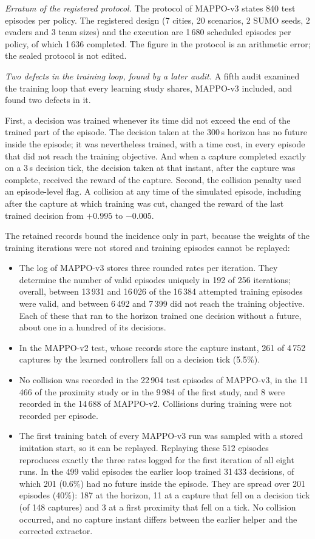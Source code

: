 \documentclass[preprint,12pt]{elsarticle}
\begin{document}
\emph{Erratum of the registered protocol.} The protocol of MAPPO-v3 states 840 test episodes per policy. The
registered design (7 cities, 20 scenarios, 2 SUMO seeds, 2 evaders and 3 team sizes) and the execution are 1\,680
scheduled episodes per policy, of which 1\,636 completed. The figure in the protocol is an arithmetic error; the
sealed protocol is not edited.

\emph{Two defects in the training loop, found by a later audit.} A fifth audit examined the training loop that
every learning study shares, MAPPO-v3 included, and found two defects in it.

First, a decision was trained whenever its time did not exceed the end of the trained part of the episode. The
decision taken at the 300\,s horizon has no future inside the episode; it was nevertheless trained, with a time cost,
in every episode that did not reach the training objective. And when a capture completed exactly on a 3\,s decision
tick, the decision taken at that instant, after the capture was complete, received the reward of the capture.
Second, the collision penalty used an episode-level flag. A collision at any time of the simulated episode,
including after the capture at which training was cut, changed the reward of the last trained decision from $+0.995$
to $-0.005$.

The retained records bound the incidence only in part, because the weights of the training iterations were not
stored and training episodes cannot be replayed:
\begin{itemize}
\item The log of MAPPO-v3 stores three rounded rates per iteration. They determine the number of valid episodes
uniquely in 192 of 256 iterations; overall, between 13\,931 and 16\,026 of the 16\,384 attempted training episodes
were valid, and between 6\,492 and 7\,399 did not reach the training objective. Each of these that ran to the
horizon trained one decision without a future, about one in a hundred of its decisions.
\item In the MAPPO-v2 test, whose records store the capture instant, 261 of 4\,752 captures by the learned
controllers fall on a decision tick (5.5\%).
\item No collision was recorded in the 22\,904 test episodes of MAPPO-v3, in the 11\,466 of the proximity study or
in the 9\,984 of the first study, and 8 were recorded in the 14\,688 of MAPPO-v2. Collisions during training were
not recorded per episode.
\item The first training batch of every MAPPO-v3 run was sampled with a stored imitation start, so it can be
replayed. Replaying these 512 episodes reproduces exactly the three rates logged for the first iteration of all
eight runs. In the 499 valid episodes the earlier loop trained 31\,433 decisions, of which 201 (0.6\%) had no future
inside the episode. They are spread over 201 episodes (40\%): 187 at the horizon, 11 at a capture that fell on a
decision tick (of 148 captures) and 3 at a first proximity that fell on a tick. No collision occurred, and no
capture instant differs between the earlier helper and the corrected extractor.
\end{itemize}
\end{document}
